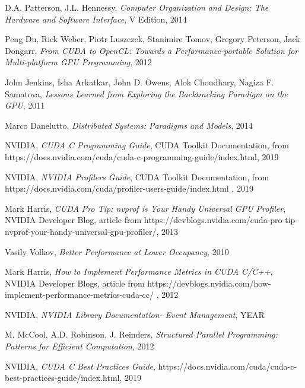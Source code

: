 \documentclass[12pt]{report}
\begin{document}
	
	\begin{thebibliography}{9}
		D.A. Patterson, J.L. Hennessy, 
		\textit{Computer Organization and Design: The Hardware and Software Interface}, V Edition, 2014
	
		Peng Du, Rick Weber, Piotr Luszczek, Stanimire Tomov, Gregory Peterson, Jack Dongarr, 
		\textit{From CUDA to OpenCL: Towards a Performance-portable Solution for Multi-platform GPU Programming}, 2012
		
		John Jenkins, Isha Arkatkar, John D. Owens, Alok Choudhary, Nagiza F. Samatova, 
		\textit{Lessons Learned from Exploring the Backtracking Paradigm on the GPU}, 2011
		
		
		Marco Danelutto,
		\textit{Distributed Systems: Paradigms and Models}, 2014
		
		NVIDIA, \textit{CUDA C Programming Guide}, CUDA Toolkit Documentation, from https://docs.nvidia.com/cuda/cuda-c-programming-guide/index.html, 2019
		
		NVIDIA, \textit{NVIDIA Profilers Guide}, CUDA Toolkit Documentation, from
		https://docs.nvidia.com/cuda/profiler-users-guide/index.html , 2019 
		
		Mark Harris, 
		\textit{CUDA Pro Tip: nvprof is Your Handy Universal GPU Profiler}, NVIDIA Developer Blog, article from https://devblogs.nvidia.com/cuda-pro-tip-nvprof-your-handy-universal-gpu-profiler/, 2013
		
		Vasily Volkov,
		\textit{Better Performance at Lower Occupancy}, 2010
		
		Mark Harris, \textit{How to Implement Performance Metrics in CUDA C/C++}, NVIDIA Developer Blogs, article from https://devblogs.nvidia.com/how-implement-performance-metrics-cuda-cc/ , 2012 
		
		NVIDIA, \textit{NVIDIA Library Documentation- Event Management}, YEAR
		
		M. McCool, A.D. Robinson, J. Reinders, \textit{Structured Parallel Programming: Patterns for Efficient Computation}, 2012
		
		NVIDIA, \textit{CUDA C Best Practices Guide}, https://docs.nvidia.com/cuda/cuda-c-best-practices-guide/index.html, 2019
	\end{thebibliography}

\end{document}
